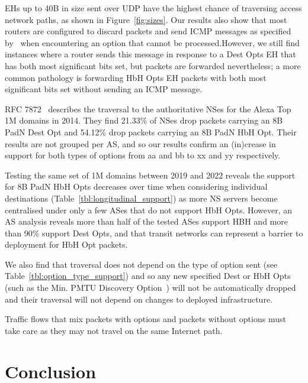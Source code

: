 \documentclass[conference]{IEEEtran}
\begin{document}
EHs up to 40B in size sent over UDP have the highest chance of traversing access network paths, as shown in Figure~\ref{fig:sizes}.
Our results also show that most routers are configured to discard packets and send ICMP messages as specified by~\cite{RFC4443} when encountering an option that cannot be processed.However, we still find instances where a router sends this message in response to a Dest Opts EH that has both most significant bits set, but packets are forwarded nevertheless; a more common pathology is forwarding HbH Opts EH packets with both most significant bits set without sending an ICMP message.
 
RFC 7872~\cite{RFC7872} describes the traversal to the authoritative NSes for the Alexa Top 1M domains in 2014. They find 21.33\% of NSes drop packets carrying an 8B PadN Dest Opt and 54.12\% drop packets carrying an 8B PadN HbH Opt.
Their results are not grouped per AS, and so our results confirm an (in)crease in support for both types of options from aa and bb to xx and yy respectively.

Testing the same set of 1M domains between 2019 and 2022 reveals the support for 8B PadN HbH Opts decreases over time when considering individual destinations (Table~\ref{tbl:longitudinal_support}) as more NS servers become centralised under only a few ASes that do not support HbH Opts. However, an AS analysis reveals more than half of the tested ASes support HBH and more than 90\% support Dest Opts, and that transit networks can represent a barrier to deployment for HbH Opt packets.

We also find that traversal does not depend on the type of option sent (see Table~\ref{tbl:option_type_support}) and so any new specified Dest or HbH Opts (such as the Min. PMTU Discovery Option~\cite{rfc9268}) will not be automatically dropped and their traversal will not depend on changes to deployed infrastructure.

Traffic flows that mix packets with options and packets without options must take care as they may not travel on the same Internet path.


\section{Conclusion}
\label{sec:conclusion}


\small

\end{document}
